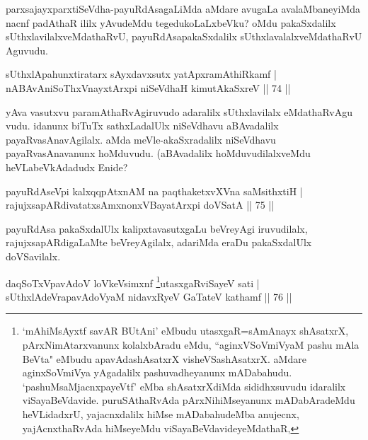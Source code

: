 \begin{artha}
parxsajayxparxtiSeVdha-payuRdAsagaLiMda aMdare avugaLa avalaMbaneyiMda nacnf padAthaR ililx yAvudeMdu tegedukoLaLxbeVku? oMdu pakaSxdalilx sUthxlavilalxveMdathaRvU, payuRdAsapakaSxdalilx sUthxlavalalxveMdathaRvU Aguvudu.
\end{artha}


\begin{shl}
sUthxlApahunxtiratarx sAyxdavxsutx yatApxramAthiRkamf |\\
nABAvAniSoThxV\s nayxtArxpi niSeVdhaH kimutAkaSxreV \hfill || 74 ||
\end{shl}

\begin{artha}
yAva vasutxvu paramAthaRvAgiruvudo adaralilx sUthxlavilalx eMdathaRvAgu	vudu. idanunx biTuTx sathxLadalUlx niSeVdhavu aBAvadalilx payaRvasAnavAgilalx. aMda meVle-akaSxradalilx niSeVdhavu payaRvasAnavanunx hoMduvudu. (aBAvadalilx hoMduvudilalxveMdu heVLabeVkAdadudx Enide?
\end{artha}

\begin{shl}
payuRdAseV\s pi kalxqqpAtxnAM na paqthaketxvXVna saMsithxtiH |\\
rajujxsapARdivatatxsAmxnonxVBayatArxpi doVSatA \hfill || 75 ||
\end{shl}

\begin{artha}%
payuRdAsa pakaSxdalUlx kalipxtavasutxgaLu beVreyAgi iruvudilalx, rajujxsapARdigaLaMte beVreyAgilalx, adariMda eraDu pakaSxdalUlx doVSavilalx.
\end{artha}



\begin{shl}
daqSoTxV\s pavAdoV loVkeV\s simxnf \footnote{`mAhiMsAyxtf savAR BUtAni' eMbudu utasxgaR=sAmAnayx shAsatxrX, pArxNimAtarxvanunx kolalxbAradu eMdu, ``aginxVSoVmiVyaM pashu mAla BeVta" eMbudu apavAdashAsatxrX visheVSashAsatxrX. aMdare aginxSoVmiVya yAgadalilx pashuvadheyanunx mADabahudu. `pashuMsaMjacnxpayeVtf' eMba shAsatxrXdiMda sididhxsuvudu idaralilx viSayaBeVdavide. puruSAthaRvAda pArxNihiMseyanunx mADabAradeMdu heVLidadxrU, yajacnxdalilx hiMse mADabahudeMba anujecnx, yajAcnxthaRvAda hiMseyeMdu viSayaBeVdavideyeMdathaR,}utasxgaRviSayeV sati |\\
sUthxlAdeVrapavAdoV\s yaM nidavxRyeV GaTateV kathamf \hfill || 76 ||
\end{shl}

